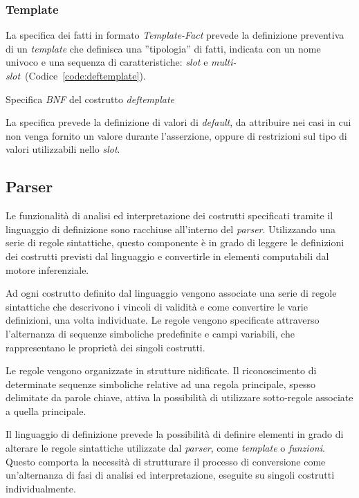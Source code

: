 \subsubsection{Template}\label{par:linguaggio-template}

La specifica dei fatti in formato \emph{Template-Fact} prevede la definizione preventiva di un \emph{template} che definisca una ''tipologia'' di fatti, indicata con un nome univoco e una sequenza di caratteristiche: \emph{slot} e \emph{multi-slot}~(Codice~\ref{code:deftemplate}).

\begin{program}
\caption{Specifica \emph{BNF} del costrutto  \emph{deftemplate}}\label{code:deftemplate}
\end{program}

La specifica prevede la definizione di valori di \emph{default}, da attribuire nei casi in cui non venga fornito un valore durante l'asserzione, oppure di restrizioni sul tipo di valori utilizzabili nello \emph{slot}.

\subsection{Parser}\label{par:parser}

Le funzionalità di analisi ed interpretazione dei costrutti specificati tramite il linguaggio di definizione sono racchiuse all'interno del \emph{parser}. Utilizzando una serie di regole sintattiche, questo componente è in grado di leggere le definizioni dei costrutti previsti dal linguaggio e convertirle in elementi computabili dal motore inferenziale.

Ad ogni costrutto definito dal linguaggio vengono associate una serie di regole sintattiche che descrivono i vincoli di validità e come convertire le varie definizioni, una volta individuate. Le regole vengono specificate attraverso l'alternanza di sequenze simboliche predefinite e campi variabili, che rappresentano le proprietà dei singoli costrutti.

Le regole vengono organizzate in strutture nidificate. Il riconoscimento di determinate sequenze simboliche relative ad una regola principale, spesso delimitate da parole chiave, attiva la possibilità di utilizzare sotto-regole associate a quella principale.

Il linguaggio di definizione prevede la possibilità di definire elementi in grado di alterare le regole sintattiche utilizzate dal \emph{parser}, come \emph{template} o \emph{funzioni}. Questo comporta la necessità di strutturare il processo di conversione come un'alternanza di fasi di analisi ed interpretazione, eseguite su singoli costrutti individualmente.

